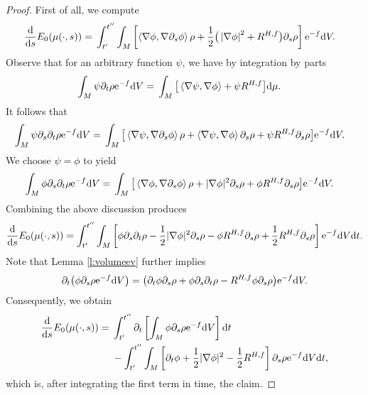 \documentclass[pdftex]{sigma}
\numberwithin{equation}{section}
\newcommand{\del}{\partial}
\newcommand{\brs}[1]{\left| #1 \right|}
\newcommand{\N}{\nabla}
\newcommand{\IP}[1]{\left<#1\right>}
\begin{document}
\begin{proof}
	First of all, we compute
	\begin{align*}
	\frac{{\rm d}}{{\rm d}s}E_0(\mu(\cdot,s)) ={}&\int_{t'}^{t''} \int_M \left[ \IP{\N \phi, \N \partial_s \phi} \rho + \frac{1}{2}\big( \brs{\N \phi}^2 + R^{H,f} \big) \partial_s \rho \right] {\rm e}^{-f} {\rm d}V.
	\end{align*}
	Observe that for an arbitrary function $\psi$, we have by integration by parts
	\begin{align*}
	\int_M \psi {\del_t \rho} {\rm e}^{-f} {\rm d}V
	={}&\int_M \big[ \IP{\N \psi, \N \phi} + \psi R^{H,f} \big] {\rm d}\mu.
	\end{align*}
	It follows that
	\begin{align*}
	\int_M \psi {\del_s\del_t \rho} {\rm e}^{-f} {\rm d}V ={}&\int_M \big[ \IP{\N \psi, \N {\del_s \phi}} \rho + \IP{\N \psi, \N \phi} {\del_s \rho} + \psi R^{H,f}\del_s\rho \big] {\rm e}^{-f} {\rm d}V.
	\end{align*}
	We choose $\psi = \phi$ to yield
	\begin{align*}
	\int_M \phi {\del_s\del_t \rho} {\rm e}^{-f} {\rm d}V ={}&\int_M \big[ \IP{\N \phi, \N {\del_s \phi}} \rho + |\N \phi|^2 {\del_s \rho} + \phi R^{H,f}\del_s\rho \big] {\rm e}^{-f} {\rm d}V.
	\end{align*}
	Combining the above discussion produces
	\begin{align*}
	\frac{{\rm d}}{{\rm d}s}E_0(\mu(\cdot,s))=\int_{t'}^{t''}\int_M\left[ \phi \del_s\del_t\rho -\frac12|\N\phi|^2 \del_s\rho-\phi R^{H,f} \del_s\rho+\frac12 R^{H,f} \del_s\rho\right] {\rm e}^{-f} {\rm d}V{\rm d}t.
	\end{align*}
	Note that Lemma \ref{l:volumeev} further implies
	\begin{align*}
	\del_t\big(\phi \del_s\rho {\rm e}^{-f} {\rm d}V\big)=\big(\del_t\phi \del_s\rho +\phi \del_s\del_t\rho - R^{H,f}\phi \del_s\rho \big){\rm e}^{-f} {\rm d}V.
	\end{align*}
	Consequently, we obtain
	\begin{align*}
	\frac{{\rm d}}{{\rm d}s} E_0(\mu(\cdot,s))={}& \int_{t'}^{t''} \del_t \left[ \int_M \phi\partial_s\rho {\rm e}^{-f} {\rm d}V \right] {\rm d}t \\
 &-\int_{t'}^{t''}\int_M\left[\del_t\phi+\frac12|\N\phi|^2-\frac12 R^{H,f}\right]\del_s\rho {\rm e}^{-f} {\rm d}V{\rm d}t,
	\end{align*}
	which is, after integrating the first term in time, the claim.
\end{proof}
\end{document}
